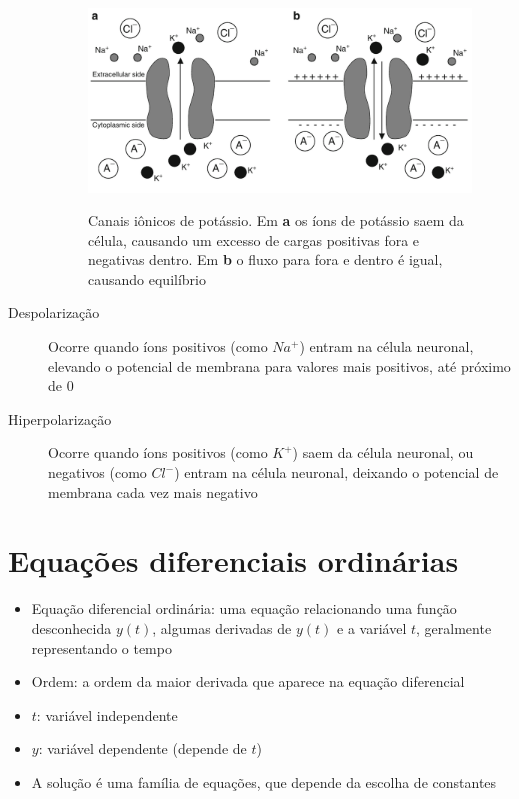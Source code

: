 \begin{description}
	\begin{figure}[htb!]
		\centering
		\caption[Canais iônicos de potássio]{Canais iônicos de potássio. Em \textbf{a} os íons de potássio saem da célula, causando um excesso de cargas positivas fora e negativas dentro. Em \textbf{b} o fluxo para fora e dentro é igual, causando equilíbrio}
		\label{fig:canaisions}
		\includegraphics[width=0.7\linewidth]{figs/canais_ions}
		\\
		\cite{ermentrout_mathematical_2010}
	\end{figure}
	
	\item[Despolarização] Ocorre quando íons positivos (como $Na^+$) entram na célula neuronal, elevando o potencial de membrana para valores mais positivos, até próximo de 0
	\item[Hiperpolarização] Ocorre quando íons positivos (como $K^+$) saem da célula neuronal, ou negativos (como $Cl^-$) entram na célula neuronal, deixando o potencial de membrana cada vez mais negativo
\end{description}

\section{Equações diferenciais ordinárias}\label{sec:eqdif}
\begin{itemize}
	\item Equação diferencial ordinária: uma equação relacionando uma função desconhecida $y(t)$, algumas derivadas de $y(t)$ e a variável $t$, geralmente representando o tempo \cite{adkins_ordinary_2012}
	\item Ordem: a ordem da maior derivada que aparece na equação diferencial
	\item $t$: variável independente
	\item $y$: variável dependente (depende de $t$)
	\item A solução é uma família de equações, que depende da escolha de constantes
\end{itemize}

